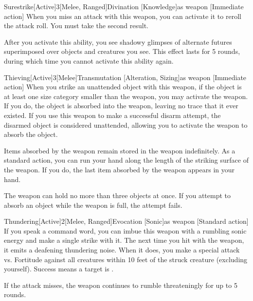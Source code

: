         \begin{magicitemdef}{Surestrike}[Active]{3}[Melee, Ranged]{Divination [Knowledge]}{as weapon}
            [Immediate action] When you miss an attack with this weapon, you can activate it to reroll the attack roll.
            You must take the second result.

            After you activate this ability, you see shadowy glimpses of alternate futures superimposed over objects and creatures you see.
            This effect lasts for 5 rounds, during which time you cannot activate this ability again.
        \end{magicitemdef}

        \begin{magicitemdef}{Thieving}[Active]{3}[Melee]{Transmutation [Alteration, Sizing]}{as weapon}
            [Immediate action] When you strike an unattended object with this weapon, if the object is at least one size category smaller than the weapon, you may activate the weapon.
            If you do, the object is absorbed into the weapon, leaving no trace that it ever existed.
            If you use this weapon to make a successful disarm attempt, the disarmed object is considered unattended, allowing you to activate the weapon to absorb the object.

             Items absorbed by the weapon remain stored in the weapon indefinitely.
            As a standard action, you can run your hand along the length of the striking surface of the weapon.
            If you do, the last item absorbed by the weapon appears in your hand.

            The weapon can hold no more than three objects at once.
            If you attempt to absorb an object while the weapon is full, the attempt fails.
        \end{magicitemdef}

        \begin{magicitemdef}{Thundering}[Active]{2}[Melee, Ranged]{Evocation [Sonic]}{as weapon}
            [Standard action] If you speak a command word, you can imbue this weapon with a rumbling sonic energy and make a single strike with it.
            The next time you hit with the weapon, it emits a deafening thundering noise.
            When it does, you make a special attack vs. Fortitude against all creatures within 10 feet of the struck creature (excluding yourself).
            Success means a target is \deafened.

            If the attack misses, the weapon continues to rumble threateningly for up to 5 rounds.
        \end{magicitemdef}

